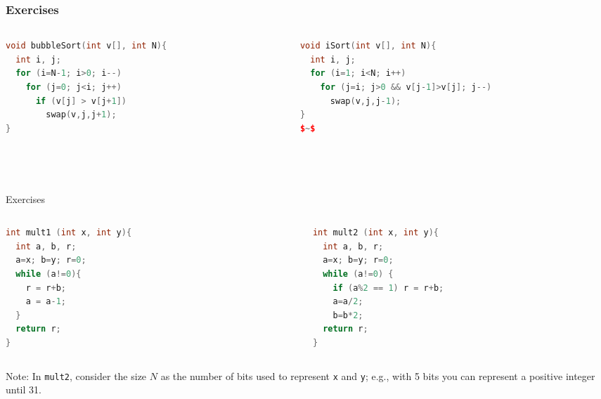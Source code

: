 \documentclass[aspectratio=169]{beamer}
\begin{document}
\begin{frame}[fragile]\frametitle{Exercises}
  
\begin{columns}
\begin{column}{0.44\textwidth}
\begin{lstlisting}[language=C++,emph={bubbleSort,swap}]
void bubbleSort(int v[], int N){
  int i, j;
  for (i=N-1; i>0; i--)
    for (j=0; j<i; j++)
      if (v[j] > v[j+1])
        swap(v,j,j+1);
}
\end{lstlisting}
\end{column}
\begin{column}{0.52\textwidth}
\begin{lstlisting}[language=C++,emph={iSort,swap}]
void iSort(int v[], int N){
  int i, j;
  for (i=1; i<N; i++)
    for (j=i; j>0 && v[j-1]>v[j]; j--)
      swap(v,j,j-1);
}
$~$
\end{lstlisting}
\end{column}
\end{columns}

~\\[-12mm]
~\\[-12mm]
\end{frame}

\begin{frame}[fragile]{Exercises}
  
\begin{columns}
\begin{column}{0.48\textwidth}
\begin{lstlisting}[language=C++,emph={mult1}]
int mult1 (int x, int y){
  int a, b, r;
  a=x; b=y; r=0;
  while (a!=0){
    r = r+b;
    a = a-1;
  }
  return r;
}
\end{lstlisting}
\end{column}
\begin{column}{0.48\textwidth}
\begin{lstlisting}[language=C++,emph={mult2}]
int mult2 (int x, int y){
  int a, b, r;
  a=x; b=y; r=0;
  while (a!=0) {
    if (a%2 == 1) r = r+b;
    a=a/2;
    b=b*2;
  return r;
}
\end{lstlisting}
\end{column}
\end{columns}
Note: In \texttt{mult2}, consider the size $N$ as the number of bits used to represent \texttt{x} and \texttt{y}; e.g., with 5 bits you can represent a positive integer until 31.

\end{frame}
\end{document}
